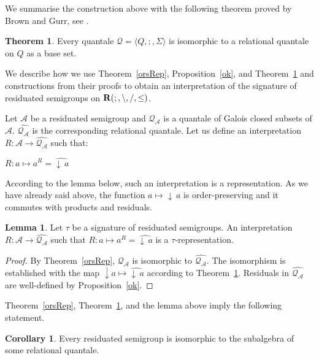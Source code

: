 \documentclass[a4paper]{article}
\theoremstyle{definition}
\theoremstyle{theorem}
\newtheorem{theorem}{Theorem}
\theoremstyle{proposition}
\theoremstyle{lemma}
\newtheorem{lemma}{Lemma}
\theoremstyle{ex}
\theoremstyle{corollary}
\newtheorem{corollary}{Corollary}
\theoremstyle{claim}
\newcommand{\down}[1]{\ensuremath{{\downarrow}\,#1}}
\begin{document}
We summarise the construction above with the following theorem proved by Brown and Gurr, see \cite[Theorem 3.11]{brown1993representation}.

\begin{theorem} \label{quantaleRep}
  Every quantale $\mathcal{Q} = \langle Q, ;, \Sigma \rangle$ is isomorphic to a relational quantale on $Q$ as a base set.
\end{theorem}

We describe how we use Theorem~\ref{orsRep}, Proposition~\ref{ok}, and Theorem~\ref{quantaleRep} and constructions from their proofs to obtain an interpretation of the signature of residuated semigroups on ${\bf R}(;, \setminus, /, \leq)$.

Let $\mathcal{A}$ be a residuated semigroup and $\mathcal{Q}_{\mathcal{A}}$ is a quantale of Galois closed subsets of $\mathcal{A}$. $\widehat{\mathcal{Q}_{\mathcal{A}}}$ is the corresponding relational quantale. Let us define an interpretation $R : \mathcal{A} \to \widehat{\mathcal{Q}_{\mathcal{A}}}$ such that:

\begin{center}
  $R : a \mapsto a^{R} = \widehat{\down{a}}$
\end{center}

According to the lemma below, such an interpretation is a representation. As we have already said above, the function $a \mapsto \down{a}$ is order-preserving and it commutes with products and residuals.

\begin{lemma}
  Let $\tau$ be a signature of residuated semigroups. An interpretation $R : \mathcal{A} \to \widehat{\mathcal{Q}_{\mathcal{A}}}$ such that $R : a \mapsto a^{R} = \widehat{\down{a}}$ is a $\tau$-representation.
\end{lemma}

\begin{proof}
  By Theorem~\ref{orsRep}, $\mathcal{Q}_{\mathcal{A}}$ is isomorphic to $\widehat{\mathcal{Q}_{\mathcal{A}}}$. The isomorphism is established with the map $\downarrow{a} \mapsto \widehat{\down{a}}$ according to Theorem~\ref{quantaleRep}.
  Residuals in $\widehat{\mathcal{Q}_{\mathcal{A}}}$ are well-defined by Proposition~\ref{ok}.
\end{proof}

Theorem~\ref{orsRep}, Theorem~\ref{quantaleRep}, and the lemma above imply the following statement.
\begin{corollary} \label{orsRep2}
  Every residuated semigroup is isomorphic to the subalgebra of some relational quantale.
\end{corollary}
\end{document}
